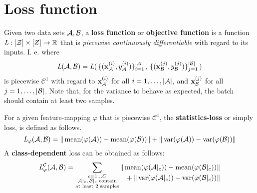 \section{Loss function}
Given two data sets $\mathcal A, \mathcal B$, a \textbf{loss function} or \textbf{objective function} is a function $\textit{L} : [\mathcal Z] \times [Z] \to \mathbb{R}$ that is \textit{piecewise continuously differentiable} with regard to its inputs.
I. e. where 
\[
    \textit{L} (\mathcal A, \mathcal B) = \textit{L} (
    \,\{(\mathbf x^{(i)}_{\mathcal A}, y^{(i)}_{\mathcal A})\}_{i=1}^{|\mathcal A|}\,,
    \,\{(\mathbf x^{(j)}_{\mathcal B}, y^{(j)}_{\mathcal B})\}_{j=1}^{|\mathcal B|}\,) 
\]
is piecewise $\mathcal C^1$ with regard to $\mathbf x^{(i)}_{\mathcal A}$
for all $i=1, \dots, |\mathcal A|$, and $\mathbf x^{(j)}_{\mathcal B}$ for all $j=1, \dots, |\mathcal B|$.
Note that, for the variance to behave as expected, the batch should contain at least two samples.

For a given feature-mapping $\varphi$ that is piecewise $\mathcal C ^1$, the \textbf{statistics-loss} or simply loss, is defined as follows.
% 
\begin{equation}
    \textit{L} _{\varphi} (\mathcal A, \mathcal B) = 
    \|\operatorname{mean} ({\varphi (\mathcal A)}) - \operatorname{mean} ({\varphi (\mathcal B)})\| +
    \|\operatorname{var} ({\varphi (\mathcal A)}) - \operatorname{var} ({\varphi (\mathcal B)})\|
    \label{eqn:statistics_loss}
\end{equation}
% 
A \textbf{class-dependent} loss can be obtained as follows:
\begin{equation}
\label{eqn:class_statistics_loss}
    \textit{L} _\varphi ^{\mathcal C} (\mathcal A, \mathcal B) =
    \sum _{\substack{c = 1 \dots C \\ \mathcal A|_c,\, \mathcal B|_c \text{ contain} \\ \text{at least 2 samples}}}
    \begin{alignedat}[t]{1}
        \|\operatorname{mean} ({\varphi (\mathcal A|_c)}) - \operatorname{mean}({\varphi (\mathcal B|_c)}) &\| \\
        {} + \|\operatorname{var} ({\varphi (\mathcal A|_c)}) - \operatorname{var} ({\varphi (\mathcal B|_c)}) &\| 
    \end{alignedat}
\end{equation}

